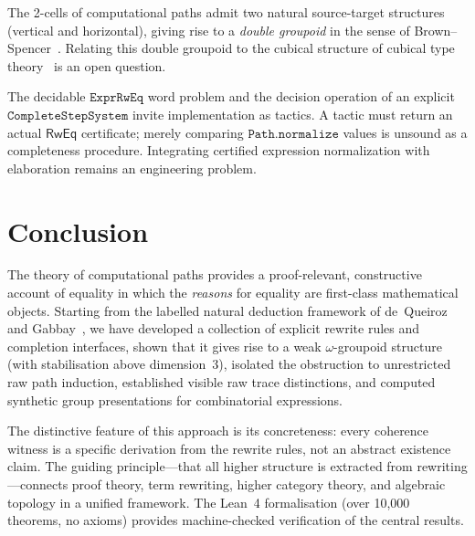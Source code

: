 \documentclass[manuscript]{BSLstyle}
\newcommand{\RwEq}{\mathsf{RwEq}}
\begin{document}
\begin{problem}\label{prob:double}
The 2-cells of computational paths admit two natural source-target
structures (vertical and horizontal), giving rise to a \emph{double
groupoid} in the sense of Brown--Spencer~\cite{BrownSpencer76}.
Relating this double groupoid to the cubical structure of cubical type
theory~\cite{CCHM18,BrownHiggins81} is an open question.
\end{problem}

\begin{problem}\label{prob:automation}
The decidable \(\texttt{ExprRwEq}\) word problem and the decision operation of
an explicit \(\texttt{CompleteStepSystem}\) invite implementation as tactics.
A tactic must return an actual \(\RwEq\) certificate; merely comparing
\(\texttt{Path.normalize}\) values is unsound as a completeness procedure.
Integrating certified expression normalization with elaboration remains an
engineering problem.
\end{problem}

\section{Conclusion}\label{sec:conclusion}

The theory of computational paths provides a proof-relevant, constructive
account of equality in which the \emph{reasons} for equality are
first-class mathematical objects.  Starting from the labelled natural
deduction framework of de~Queiroz and
Gabbay~\cite{GabbaydeQueiroz92:c-h:full,Gabbay96:LDS}, we have developed
a collection of explicit rewrite rules and completion interfaces, shown
that it gives rise to a weak $\omega$-groupoid structure
(with stabilisation above dimension~3), isolated the obstruction to
unrestricted raw path induction, established visible raw trace distinctions,
and computed synthetic group presentations for combinatorial expressions.

The distinctive feature of this approach is its concreteness: every
coherence witness is a specific derivation from the rewrite rules, not
an abstract existence claim.  The guiding principle---that all higher
structure is extracted from rewriting---connects proof theory, term
rewriting, higher category theory, and algebraic topology in a unified
framework.  The Lean~4 formalisation (over 10{,}000 theorems, no axioms)
provides machine-checked verification of the central results.
\end{document}
